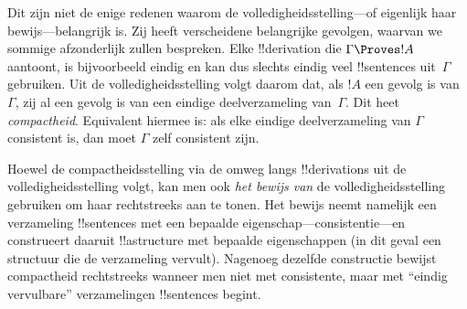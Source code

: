 \documentclass[openany]{memoir}
\begin{document}
Dit zijn niet de enige redenen waarom de volledigheidsstelling---of
eigenlijk haar bewijs---belangrijk is. Zij heeft verscheidene
belangrijke gevolgen, waarvan we sommige afzonderlijk zullen
bespreken. Elke !!{derivation} die $\Gamma \Proves !A$ aantoont, is
bijvoorbeeld eindig en kan dus slechts eindig veel !!{sentence}s
uit~$\Gamma$ gebruiken. Uit de volledigheidsstelling volgt daarom dat,
als $!A$ een gevolg is van~$\Gamma$, zij al een gevolg is van een
eindige deelverzameling van~$\Gamma$. Dit heet \emph{compactheid}.
Equivalent hiermee is: als elke eindige deelverzameling van $\Gamma$
consistent is, dan moet $\Gamma$ zelf consistent zijn.

Hoewel de compactheidsstelling via de omweg langs !!{derivation}s uit
de volledigheidsstelling volgt, kan men ook \emph{het bewijs van} de
volledigheidsstelling gebruiken om haar rechtstreeks aan te tonen. Het
bewijs neemt namelijk een verzameling !!{sentence}s met een bepaalde
eigenschap---consistentie---en construeert daaruit !!a{structure} met
bepaalde eigenschappen (in dit geval een structuur die de verzameling
vervult). Nagenoeg dezelfde constructie bewijst compactheid
rechtstreeks wanneer men niet met consistente, maar met ``eindig
vervulbare'' verzamelingen !!{sentence}s begint.
\endgroup

\begingroup
\def\olfilename{OLP-0128}
\def\olfilepath{content/first-order-logic/completeness/}
\hypertarget{unit-OLP-0128}{}



      {}
      {}

\end{document}
